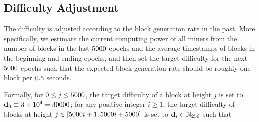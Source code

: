 \subsection{Difficulty Adjustment}
\label{sec:difficulty}


The difficulty is adjusted according to the block generation rate in the past.
More specifically,
we estimate the current computing power of all miners from the number of blocks in the last $5000$ epochs and the average timestamps of blocks in the beginning and ending epochs,
and then set the target difficulty for the next $5000$ epochs such that the expected block generation rate should be roughly one block per $0.5$ seconds.

Formally,
for $0\le j\le 5000$,
the target difficulty of a block at height $j$ is set to $\mathbf{d}_0\equiv {3\times 10^4=30000}$;
for any positive integer $i\ge 1$,
the target difficulty of blocks at height $j\in [5000 i+1,5000 i+5000]$ is set to $\mathbf{d}_i \in\mathbb{N}_{256}$ such that

